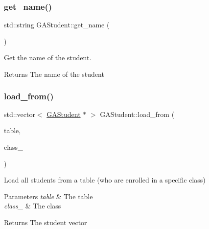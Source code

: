 \subsubsection{\texorpdfstring{get\+\_\+name()}{get\_name()}}
{\footnotesize\ttfamily std\+::string G\+A\+Student\+::get\+\_\+name (\begin{DoxyParamCaption}{ }\end{DoxyParamCaption})}



Get the name of the student. 

\begin{DoxyReturn}{Returns}
The name of the student 
\end{DoxyReturn}
\mbox{\label{class_g_a_student_a7b95740499af16d32f2b12ec2508ee7e}} 
\subsubsection{\texorpdfstring{load\+\_\+from()}{load\_from()}}
{\footnotesize\ttfamily std\+::vector$<$ \hyperlink{class_g_a_student}{G\+A\+Student} $\ast$ $>$ G\+A\+Student\+::load\+\_\+from (\begin{DoxyParamCaption}\item[{\hyperlink{class_database_table}{Database\+Table} $\ast$}]{table,  }\item[{\hyperlink{class_g_a_class}{G\+A\+Class} $\ast$}]{class\+\_\+ }\end{DoxyParamCaption})\hspace{0.3cm}{\ttfamily [static]}}



Load all students from a table (who are enrolled in a specific class) 


\begin{DoxyParams}{Parameters}
{\em table} & The table \\
\hline
{\em class\+\_\+} & The class \\
\hline
\end{DoxyParams}
\begin{DoxyReturn}{Returns}
The student vector 
\end{DoxyReturn}
\mbox{\label{class_g_a_student_a35c859da932a8a83f5622bcd46ae1269}} 
